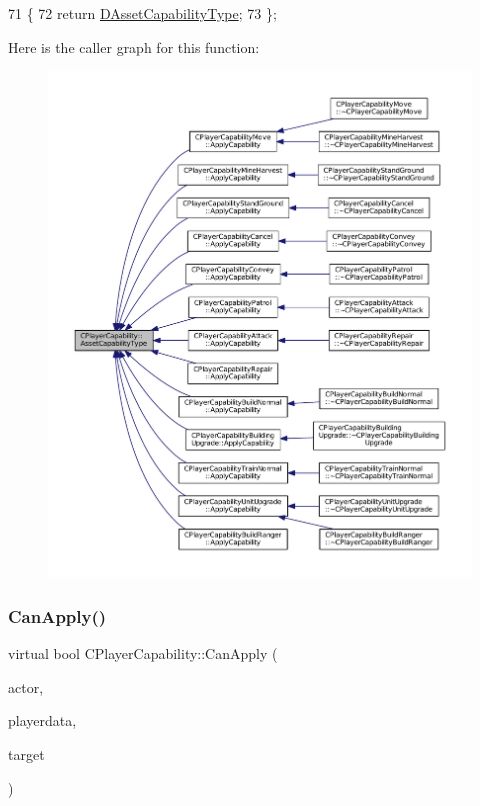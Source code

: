 \begin{DoxyCode}
71                                                         \{
72             \textcolor{keywordflow}{return} \hyperlink{classCPlayerCapability_a09011bc8c74c698bfb65f06a1840c6e1}{DAssetCapabilityType};
73         \};
\end{DoxyCode}
Here is the caller graph for this function\+:\nopagebreak
\begin{figure}[H]
\begin{center}
\leavevmode
\includegraphics[width=350pt]{classCPlayerCapability_a433bb196cd6ab6a932f1cac102b3aa98_icgraph}
\end{center}
\end{figure}
\hypertarget{classCPlayerCapability_ae96263e0950f496492f8baeb877b9554}{}\label{classCPlayerCapability_ae96263e0950f496492f8baeb877b9554} 
\subsubsection{\texorpdfstring{Can\+Apply()}{CanApply()}}
{\footnotesize\ttfamily virtual bool C\+Player\+Capability\+::\+Can\+Apply (\begin{DoxyParamCaption}\item[{std\+::shared\+\_\+ptr$<$ \hyperlink{classCPlayerAsset}{C\+Player\+Asset} $>$}]{actor,  }\item[{std\+::shared\+\_\+ptr$<$ \hyperlink{classCPlayerData}{C\+Player\+Data} $>$}]{playerdata,  }\item[{std\+::shared\+\_\+ptr$<$ \hyperlink{classCPlayerAsset}{C\+Player\+Asset} $>$}]{target }\end{DoxyParamCaption})\hspace{0.3cm}{\ttfamily [pure virtual]}}



